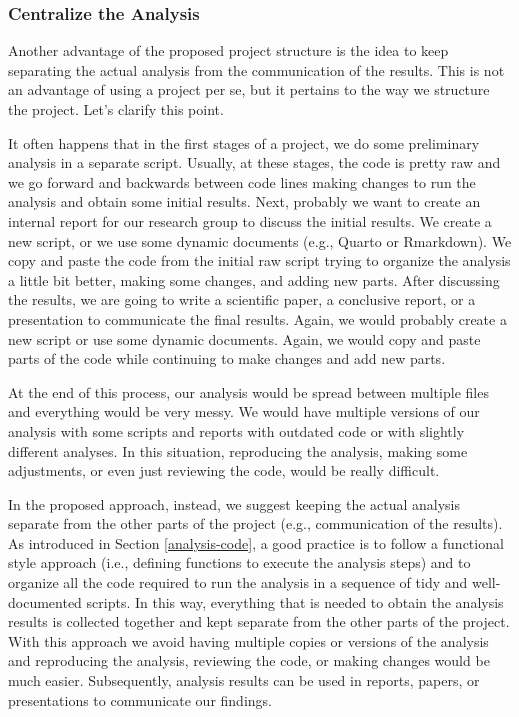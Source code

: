 \documentclass[
  11pt,
]{book}
\begin{document}
\hypertarget{centralize-analysis}{%
\subsubsection{Centralize the Analysis}\label{centralize-analysis}}

Another advantage of the proposed project structure is the idea to keep separating the actual analysis from the communication of the results. This is not an advantage of using a project per se, but it pertains to the way we structure the project. Let's clarify this point.

It often happens that in the first stages of a project, we do some preliminary analysis in a separate script. Usually, at these stages, the code is pretty raw and we go forward and backwards between code lines making changes to run the analysis and obtain some initial results. Next, probably we want to create an internal report for our research group to discuss the initial results. We create a new script, or we use some dynamic documents (e.g., Quarto or Rmarkdown). We copy and paste the code from the initial raw script trying to organize the analysis a little bit better, making some changes, and adding new parts. After discussing the results, we are going to write a scientific paper, a conclusive report, or a presentation to communicate the final results. Again, we would probably create a new script or use some dynamic documents. Again, we would copy and paste parts of the code while continuing to make changes and add new parts.

At the end of this process, our analysis would be spread between multiple files and everything would be very messy. We would have multiple versions of our analysis with some scripts and reports with outdated code or with slightly different analyses. In this situation, reproducing the analysis, making some adjustments, or even just reviewing the code, would be really difficult.

In the proposed approach, instead, we suggest keeping the actual analysis separate from the other parts of the project (e.g., communication of the results). As introduced in Section \ref{analysis-code}, a good practice is to follow a functional style approach (i.e., defining functions to execute the analysis steps) and to organize all the code required to run the analysis in a sequence of tidy and well-documented scripts. In this way, everything that is needed to obtain the analysis results is collected together and kept separate from the other parts of the project. With this approach we avoid having multiple copies or versions of the analysis and reproducing the analysis, reviewing the code, or making changes would be much easier. Subsequently, analysis results can be used in reports, papers, or presentations to communicate our findings.
\end{document}
